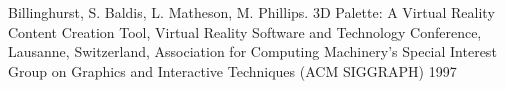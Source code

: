 
\begin{cvhonors}

  \cvhonor
    {Billinghurst, S. Baldis, L. Matheson, M. Phillips.} 
    {3D Palette: A Virtual Reality Content Creation Tool, Virtual Reality Software and Technology Conference, Lausanne, Switzerland, Association for Computing Machinery’s Special Interest Group on Graphics and Interactive Techniques (ACM SIGGRAPH)} %
    {1997} %
    { } %
    { }
\end{cvhonors}
